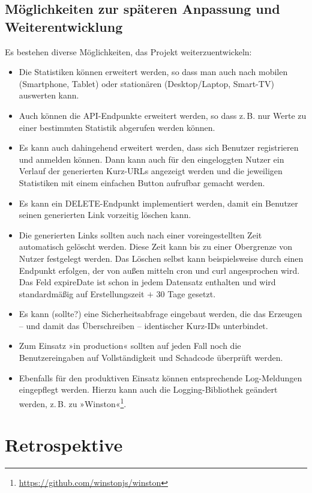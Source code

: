 \documentclass[a4paper,11pt,DIV=12,overfullrule=on]{scrreprt}%
\begin{document}
\section{Möglichkeiten zur späteren Anpassung und Weiterentwicklung}
Es bestehen diverse Möglichkeiten, das Projekt weiterzuentwickeln:
\begin{itemize}
    \item Die Statistiken können erweitert werden, so dass man auch nach mobilen (Smartphone, Tablet) oder stationären (Desktop/Laptop, Smart-TV) auswerten kann.
    \item Auch können die \ac{API}-Endpunkte erweitert werden, so dass z.\,B. nur Werte zu einer bestimmten Statistik abgerufen werden können.
    \item Es kann auch dahingehend erweitert werden, dass sich Benutzer registrieren und anmelden können. Dann kann auch für den eingeloggten Nutzer ein Verlauf der generierten Kurz-\ac{URL}s angezeigt werden und die jeweiligen Statistiken mit einem einfachen Button aufrufbar gemacht werden.
    \item Es kann ein DELETE-Endpunkt implementiert werden, damit ein Benutzer seinen generierten Link vorzeitig löschen kann.
    \item Die generierten Links sollten auch nach einer voreingestellten Zeit automatisch gelöscht werden. Diese Zeit kann bis zu einer Obergrenze von Nutzer festgelegt werden. Das Löschen selbst kann beispielsweise durch einen Endpunkt erfolgen, der von außen mitteln {\ttfamily cron} und {\ttfamily curl} angesprochen wird. Das Feld {\ttfamily expireDate} ist schon in jedem Datensatz enthalten und wird standardmäßig auf Erstellungszeit $+$ 30 Tage gesetzt.
    \item \label{sec:ErweiterungKollision}Es kann (sollte?) eine Sicherheitsabfrage eingebaut werden, die das Erzeugen – und damit das Überschreiben – identischer Kurz-IDs unterbindet.
    \item Zum Einsatz »in production« sollten auf jeden Fall noch die Benutzereingaben auf Vollständigkeit und Schadcode überprüft werden.
    \item Ebenfalls für den produktiven Einsatz können entsprechende Log-Meldungen eingepflegt werden. Hierzu kann auch die Logging-Bibliothek geändert werden, z.\,B. zu »Winston«\footnote{\href{https://github.com/winstonjs/winston}{https://github.com/winstonjs/winston}}.
\end{itemize}
    
\chapter{Retrospektive}
\end{document}
